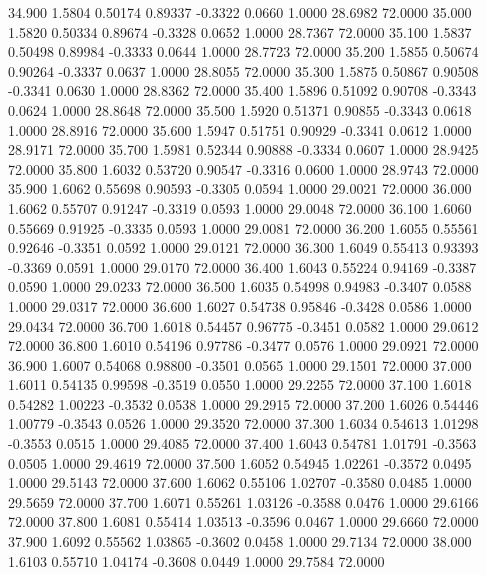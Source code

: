   34.900   1.5804   0.50174   0.89337  -0.3322   0.0660   1.0000  28.6982  72.0000
  35.000   1.5820   0.50334   0.89674  -0.3328   0.0652   1.0000  28.7367  72.0000
  35.100   1.5837   0.50498   0.89984  -0.3333   0.0644   1.0000  28.7723  72.0000
  35.200   1.5855   0.50674   0.90264  -0.3337   0.0637   1.0000  28.8055  72.0000
  35.300   1.5875   0.50867   0.90508  -0.3341   0.0630   1.0000  28.8362  72.0000
  35.400   1.5896   0.51092   0.90708  -0.3343   0.0624   1.0000  28.8648  72.0000
  35.500   1.5920   0.51371   0.90855  -0.3343   0.0618   1.0000  28.8916  72.0000
  35.600   1.5947   0.51751   0.90929  -0.3341   0.0612   1.0000  28.9171  72.0000
  35.700   1.5981   0.52344   0.90888  -0.3334   0.0607   1.0000  28.9425  72.0000
  35.800   1.6032   0.53720   0.90547  -0.3316   0.0600   1.0000  28.9743  72.0000
  35.900   1.6062   0.55698   0.90593  -0.3305   0.0594   1.0000  29.0021  72.0000
  36.000   1.6062   0.55707   0.91247  -0.3319   0.0593   1.0000  29.0048  72.0000
  36.100   1.6060   0.55669   0.91925  -0.3335   0.0593   1.0000  29.0081  72.0000
  36.200   1.6055   0.55561   0.92646  -0.3351   0.0592   1.0000  29.0121  72.0000
  36.300   1.6049   0.55413   0.93393  -0.3369   0.0591   1.0000  29.0170  72.0000
  36.400   1.6043   0.55224   0.94169  -0.3387   0.0590   1.0000  29.0233  72.0000
  36.500   1.6035   0.54998   0.94983  -0.3407   0.0588   1.0000  29.0317  72.0000
  36.600   1.6027   0.54738   0.95846  -0.3428   0.0586   1.0000  29.0434  72.0000
  36.700   1.6018   0.54457   0.96775  -0.3451   0.0582   1.0000  29.0612  72.0000
  36.800   1.6010   0.54196   0.97786  -0.3477   0.0576   1.0000  29.0921  72.0000
  36.900   1.6007   0.54068   0.98800  -0.3501   0.0565   1.0000  29.1501  72.0000
  37.000   1.6011   0.54135   0.99598  -0.3519   0.0550   1.0000  29.2255  72.0000
  37.100   1.6018   0.54282   1.00223  -0.3532   0.0538   1.0000  29.2915  72.0000
  37.200   1.6026   0.54446   1.00779  -0.3543   0.0526   1.0000  29.3520  72.0000
  37.300   1.6034   0.54613   1.01298  -0.3553   0.0515   1.0000  29.4085  72.0000
  37.400   1.6043   0.54781   1.01791  -0.3563   0.0505   1.0000  29.4619  72.0000
  37.500   1.6052   0.54945   1.02261  -0.3572   0.0495   1.0000  29.5143  72.0000
  37.600   1.6062   0.55106   1.02707  -0.3580   0.0485   1.0000  29.5659  72.0000
  37.700   1.6071   0.55261   1.03126  -0.3588   0.0476   1.0000  29.6166  72.0000
  37.800   1.6081   0.55414   1.03513  -0.3596   0.0467   1.0000  29.6660  72.0000
  37.900   1.6092   0.55562   1.03865  -0.3602   0.0458   1.0000  29.7134  72.0000
  38.000   1.6103   0.55710   1.04174  -0.3608   0.0449   1.0000  29.7584  72.0000
